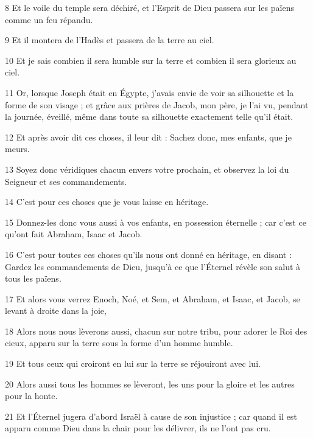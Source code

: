 \par 8 Et le voile du temple sera déchiré, et l'Esprit de Dieu passera sur les païens comme un feu répandu.

\par 9 Et il montera de l'Hadès et passera de la terre au ciel.

\par 10 Et je sais combien il sera humble sur la terre et combien il sera glorieux au ciel.

\par 11 Or, lorsque Joseph était en Égypte, j'avais envie de voir sa silhouette et la forme de son visage ; et grâce aux prières de Jacob, mon père, je l'ai vu, pendant la journée, éveillé, même dans toute sa silhouette exactement telle qu'il était.

\par 12 Et après avoir dit ces choses, il leur dit : Sachez donc, mes enfants, que je meurs.

\par 13 Soyez donc véridiques chacun envers votre prochain, et observez la loi du Seigneur et ses commandements.

\par 14 C'est pour ces choses que je vous laisse en héritage.

\par 15 Donnez-les donc vous aussi à vos enfants, en possession éternelle ; car c'est ce qu'ont fait Abraham, Isaac et Jacob.

\par 16 C'est pour toutes ces choses qu'ils nous ont donné en héritage, en disant : Gardez les commandements de Dieu, jusqu'à ce que l'Éternel révèle son salut à tous les païens.

\par 17 Et alors vous verrez Enoch, Noé, et Sem, et Abraham, et Isaac, et Jacob, se levant à droite dans la joie,

\par 18 Alors nous nous lèverons aussi, chacun sur notre tribu, pour adorer le Roi des cieux, apparu sur la terre sous la forme d'un homme humble.

\par 19 Et tous ceux qui croiront en lui sur la terre se réjouiront avec lui.

\par 20 Alors aussi tous les hommes se lèveront, les uns pour la gloire et les autres pour la honte.

\par 21 Et l'Éternel jugera d'abord Israël à cause de son injustice ; car quand il est apparu comme Dieu dans la chair pour les délivrer, ils ne l'ont pas cru.

